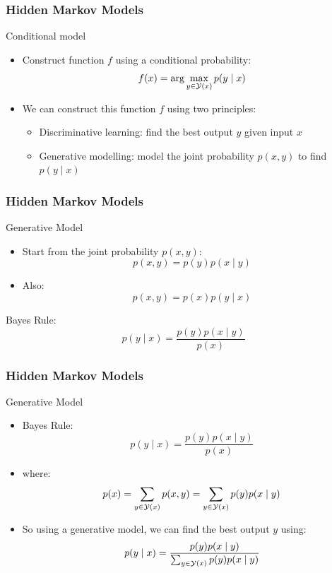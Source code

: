 \begin{frame}
\frametitle{Hidden Markov Models}
\begin{block}{Conditional model}
\begin{itemize}[<+->]
\item Construct function $f$ using a conditional probability:
\[ f(x) = \arg\max_{y \in {\cal Y}(x)} p(y \mid x) \]
\item We can construct this function $f$ using two principles:
\begin{itemize}
\item Discriminative learning: find the best output $y$ given input $x$
\item Generative modelling: model the joint probability $p(x,y)$ to find $p(y \mid x)$
\end{itemize}
\end{itemize}
\end{block}
\end{frame}

\begin{frame}
\frametitle{Hidden Markov Models}
\begin{block}{Generative Model}
\begin{itemize}[<+->]
\item Start from the joint probability $p(x,y)$:
\[ p(x,y) = p(y) p(x \mid y) \]
\item Also:
\[ p(x,y) = p(x) p(y \mid x) \]
\end{itemize}
\end{block}
\begin{block}{Bayes Rule:}
\[ p(y \mid x) = \frac{ p(y) p(x \mid y) }{ p(x) } \]
\end{block}
\end{frame}

\begin{frame}
\frametitle{Hidden Markov Models}
\begin{block}{Generative Model}
\begin{itemize}[<+->]
\item Bayes Rule:
\[ p(y \mid x) = \frac{ p(y) p(x \mid y) }{ p(x) } \]
\item where:
\[ p(x) = \sum_{y \in {\cal Y}(x)} p(x, y) = \sum_{y \in {\cal Y}(x)} p(y) p(x \mid y) \]
\item So using a generative model, we can find the best output $y$ using:
\[ p(y \mid x) = \frac{ p(y) p(x \mid y) }{ \sum_{y \in {\cal Y}(x)} p(y) p(x \mid y) } \]
\end{itemize}
\end{block}
\end{frame}

